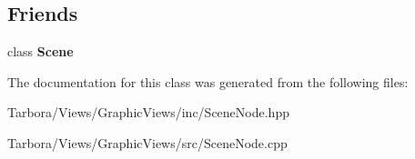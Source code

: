 \subsection*{Friends}
\begin{DoxyCompactItemize}
\item 
\mbox{\label{classTarbora_1_1SceneNode_a032858ae1fe02d2d1170981c2af2d67c}} 
class {\bfseries Scene}
\end{DoxyCompactItemize}


The documentation for this class was generated from the following files\+:\begin{DoxyCompactItemize}
\item 
Tarbora/\+Views/\+Graphic\+Views/inc/Scene\+Node.\+hpp\item 
Tarbora/\+Views/\+Graphic\+Views/src/Scene\+Node.\+cpp\end{DoxyCompactItemize}
